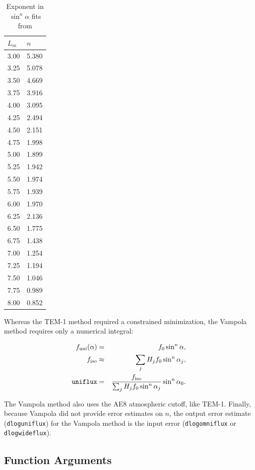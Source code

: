 \documentclass{article}    %
\begin{document}
\begin{table}[htbp]
\caption{Exponent in $\sin^n\alpha$ fits from \citet{Vampola1996}}
\label{tblVampola}
\begin{tabular}{ll}
$L_m$ & $n$ \\
\hline
    3.00 &   5.380 \\
    3.25 &   5.078 \\
    3.50 &   4.669 \\
    3.75 &   3.916 \\
    4.00 &   3.095 \\
    4.25 &   2.494 \\
    4.50 &   2.151 \\
    4.75 &   1.998 \\
    5.00 &   1.899 \\
    5.25 &   1.942 \\
    5.50 &   1.974 \\
    5.75 &   1.939 \\
    6.00 &   1.970 \\
    6.25 &   2.136 \\
    6.50 &   1.775 \\
    6.75 &   1.438 \\
    7.00 &   1.254 \\
    7.25 &   1.194 \\
    7.50 &   1.046 \\
    7.75 &   0.989 \\
    8.00 &   0.852
\end{tabular}
\end{table}

Whereas the TEM-1 method required a constrained minimization, the
Vampola method requires only a numerical integral:

\begin{eqnarray}
f_{\rm uni}(\alpha) &=& f_0 \sin^n\alpha, \\
f_{\rm iso} &\approx& \sum_j H_j f_0 \sin^n \alpha_j , \\ 
\verb|uniflux| &=& \frac{f_{\rm iso}}{\sum_{j} H_j f_0 \sin^n \alpha_j}\sin^n\alpha_{0}.
\end{eqnarray}

The Vampola method also uses the AE8 atmospheric cutoff, like TEM-1.
Finally, because Vampola did not provide error estimates on $n$, the
output error estimate (\verb|dloguniflux|) for the Vampola method is
the input error (\verb|dlogomniflux| or \verb|dlogwideflux|).


\subsection{Function Arguments}
\end{document}
